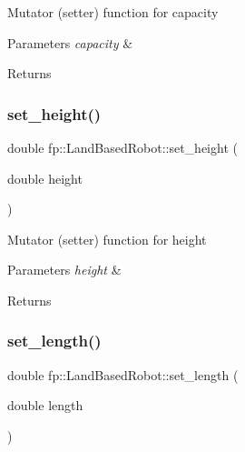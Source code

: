 Mutator (setter) function for capacity 
\begin{DoxyParams}{Parameters}
{\em capacity} & \\
\hline
\end{DoxyParams}
\begin{DoxyReturn}{Returns}

\end{DoxyReturn}
\mbox{\label{classfp_1_1_land_based_robot_a2197cbdc219c952931fe05ad707ab9ed}} 
\subsubsection{\texorpdfstring{set\+\_\+height()}{set\_height()}}
{\footnotesize\ttfamily double fp\+::\+Land\+Based\+Robot\+::set\+\_\+height (\begin{DoxyParamCaption}\item[{double}]{height }\end{DoxyParamCaption})\hspace{0.3cm}{\ttfamily [inline]}}

Mutator (setter) function for height 
\begin{DoxyParams}{Parameters}
{\em height} & \\
\hline
\end{DoxyParams}
\begin{DoxyReturn}{Returns}

\end{DoxyReturn}
\mbox{\label{classfp_1_1_land_based_robot_a7dc263eed0275d71688a2e57fe93029a}} 
\subsubsection{\texorpdfstring{set\+\_\+length()}{set\_length()}}
{\footnotesize\ttfamily double fp\+::\+Land\+Based\+Robot\+::set\+\_\+length (\begin{DoxyParamCaption}\item[{double}]{length }\end{DoxyParamCaption})\hspace{0.3cm}{\ttfamily [inline]}}

